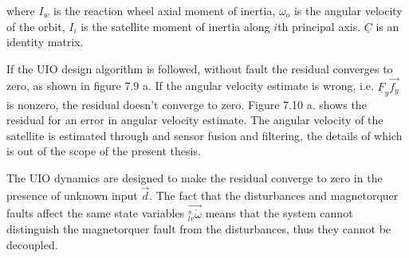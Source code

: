 
where $I_w$ is the reaction wheel axial moment of inertia, $\omega_o$ is the angular velocity of the orbit, $I_i$ is the satellite moment of inertia along $i$th principal axis. $\underline{C}$ is an identity matrix. 

If the UIO design algorithm is followed, without fault the residual converges to zero, as shown in figure 7.9 a. If the angular velocity estimate is wrong, i.e. $\underline{F}_y \vec{f_y}$ is nonzero, the residual doesn't converge to zero. Figure 7.10 a. shows the residual for an error in angular velocity estimate. The angular velocity of the satellite is estimated through and sensor fusion and filtering, the details of which is out of the scope of the present thesis.

The UIO dynamics are designed to make the residual converge to zero in the presence of unknown input $\vec{d}$. The fact that the disturbances and magnetorquer faults affect the same state variables $\vec{_{lv}^s\dot{\omega}}$ means that the system cannot distinguish the magnetorquer fault from the disturbances, thus they cannot be decoupled.

